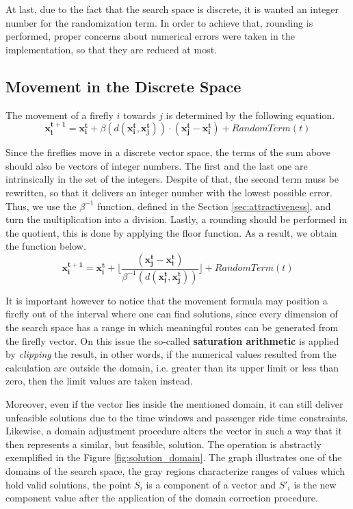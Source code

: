 \documentclass[tuberlin,cic,tc,openright,english,noabntcite,oneside]{iiufrgs}
\begin{document}
At last, due to the fact that the search space is discrete, it is wanted an integer number for the randomization term. In order to achieve that, rounding is performed, proper concerns about numerical errors were taken in the implementation, so that they are reduced at most.

\subsection{Movement in the Discrete Space}
The movement of a firefly $i$ towards $j$ is determined by the following equation.
$$\mathbf{x^{t+1}_i} = \mathbf{x^{t}_i} + \beta(d(\mathbf{x^{t}_i}, \mathbf{x^{t}_j})) \cdot (\mathbf{x^{t}_j} - \mathbf{x^{t}_i}) + RandomTerm(t)$$

Since the fireflies move in a discrete vector space, the terms of the sum above should also be vectors of integer numbers. The first and the last one are intrinsically in the set of the integers. Despite of that, the second term muss be rewritten, so that it delivers an integer number with the lowest possible error. Thus, we use the $\beta^{-1}$ function, defined in the Section \ref{sec:attractiveness}, and turn the multiplication into a division. Lastly, a rounding should be performed in the quotient, this is done by applying the floor function. As a result, we obtain the function below.
$$\mathbf{x^{t+1}_i} = \mathbf{x^{t}_i} +  \lfloor \frac{(\mathbf{x^{t}_j} - \mathbf{x^{t}_i})}{\beta^{-1}(d(\mathbf{x^{t}_i}, \mathbf{x^{t}_j}))} \rfloor + RandomTerm(t)$$

It is important however to notice that the movement formula may position a firefly out of the interval where one can find solutions, since every dimension of the search space has a range in which meaningful routes can be generated from the firefly vector. On this issue the so-called \textbf{saturation arithmetic} is applied by \emph{clipping} the result, in other words, if the numerical values resulted from the calculation are outside the domain, i.e. greater than its upper limit or less than zero, then the limit values are taken instead.

Moreover, even if the vector lies inside the mentioned domain, it can still deliver unfeasible solutions due to the time windows and passenger ride time constraints. Likewise, a domain adjustment procedure alters the vector in such a way that it then represents a similar, but feasible, solution. The operation is abstractly exemplified in the Figure \ref{fig:solution_domain}. The graph illustrates one of the domains of the search space, the gray regions characterize ranges of values which hold valid solutions, the point $S_i$ is a component of a vector and $S'_i$ is the new component value after the application of the domain correction procedure.
\end{document}
